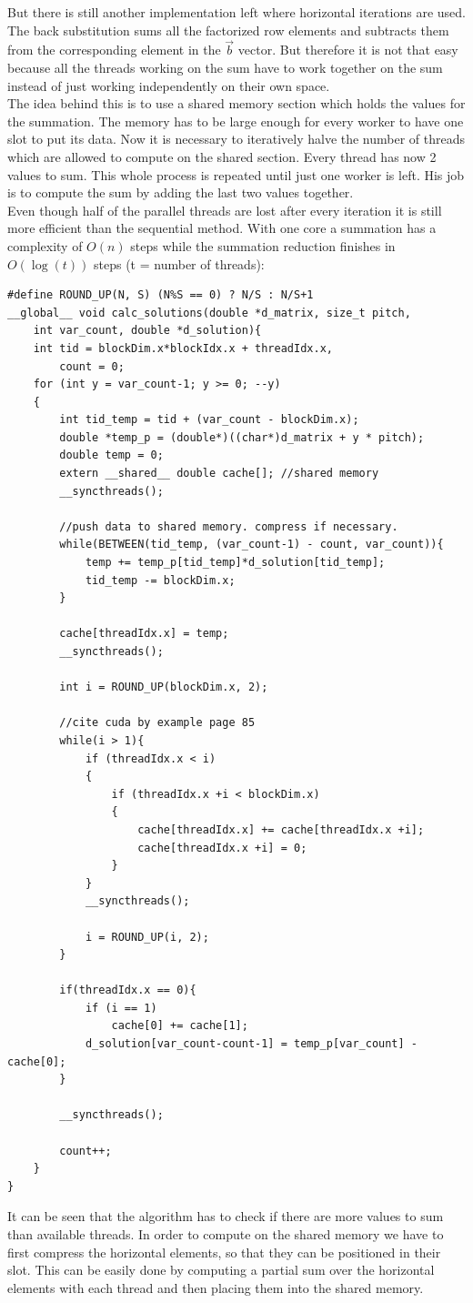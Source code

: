 \documentclass[draft, final]{vutinfth} %
\begin{document}
			But there is still another implementation left where horizontal iterations are used. The back substitution sums all the factorized row elements and subtracts them from the corresponding element in the $\vec{b}$ vector. But therefore it is not that easy because all the threads working on the sum have to work together on the sum instead of just working independently on their own space.\\
			
			The idea behind this is to use a shared memory section which holds the values for the summation. The memory has to be large enough for every worker to have one slot to put its data. Now it is necessary to iteratively halve the number of threads which are allowed to compute on the shared section. Every thread has now 2 values to sum. This whole process is repeated until just one worker is left. His job is to compute the sum by adding the last two values together.\\
			Even though half of the parallel threads are lost after every iteration it is still more efficient than the sequential method. With one core a summation has a complexity of $O(n)$ steps while the summation reduction finishes in $O(\log(t))$ steps (t = number of threads):

			\begin{lstlisting}
#define ROUND_UP(N, S) (N%S == 0) ? N/S : N/S+1
__global__ void calc_solutions(double *d_matrix, size_t pitch,
	int var_count, double *d_solution){
	int tid = blockDim.x*blockIdx.x + threadIdx.x,
		count = 0;
	for (int y = var_count-1; y >= 0; --y)
	{
		int tid_temp = tid + (var_count - blockDim.x);
		double *temp_p = (double*)((char*)d_matrix + y * pitch);
		double temp = 0;
		extern __shared__ double cache[]; //shared memory
		__syncthreads();

		//push data to shared memory. compress if necessary.
		while(BETWEEN(tid_temp, (var_count-1) - count, var_count)){
			temp += temp_p[tid_temp]*d_solution[tid_temp];
			tid_temp -= blockDim.x;
		}

		cache[threadIdx.x] = temp;
		__syncthreads();

		int i = ROUND_UP(blockDim.x, 2);

		//cite cuda by example page 85
		while(i > 1){
			if (threadIdx.x < i)
			{
				if (threadIdx.x +i < blockDim.x)
				{
					cache[threadIdx.x] += cache[threadIdx.x +i];
					cache[threadIdx.x +i] = 0;
				}
			}
			__syncthreads();

			i = ROUND_UP(i, 2);
		}

		if(threadIdx.x == 0){
			if (i == 1)
				cache[0] += cache[1];
			d_solution[var_count-count-1] = temp_p[var_count] - cache[0];
		}

		__syncthreads();

		count++;
	}
}
			\end{lstlisting}
			It can be seen that the algorithm has to check if there are more values to sum than available threads. In order to compute on the shared memory we have to first compress the horizontal elements, so that they can be positioned in their slot. This can be easily done by computing a partial sum over the horizontal elements with each thread and then placing them into the shared memory.
\end{document}

